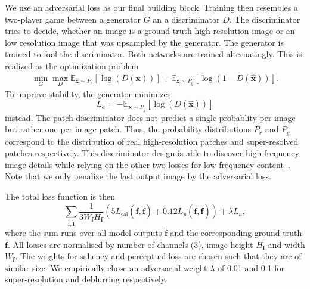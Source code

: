 \documentclass{scrartcl}
\newcommand{\img}{\bm{f}} %
\begin{document}
We use an adversarial loss as our final building block.
Training then resembles a two-player game between a generator \(G\) an a discriminator \(D\).
The discriminator tries to decide, whether an image is a ground-truth high-resolution image or an low resolution image that was upsampled by the generator.
The generator is trained to fool the discriminator.
Both networks are trained alternatingly.
This is realized as the optimization problem~\cite{GAN}
\begin{align}
 \min_G \max_D \mathbb{E}_{\bm{x} \sim P_r} \left[ \log (D({\bm{x}})) \right] +
  \mathbb{E}_{\hat{\bm{x}} \sim P_g} \left[  \log (1 - D(\hat{\bm{x}})) \right].
\end{align}
To improve stability, the generator minimizes
\begin{equation}
  L_a = - \mathbb{E}_{\hat{\bm{x}} \sim P_g} \left[ \log (D(\hat{\bm{x}})) \right]
\end{equation}
instead.
The patch-discriminator does not predict a single probablity per image but rather one per image patch.
Thus, the probability distributions $P_r$ and $P_g$ correspond to the distribution of real high-resolution patches and super-resolved patches respectively.
This discriminator design is able to discover high-frequency image details while relying on the other two losses for low-frequency content~\cite{PatchGAN}.
Note that we only penalize the last output image by the adversarial loss.

The total loss function is then
\begin{equation}
  \label{eq:total-loss}
\sum_{\img, \hat{\img}}
\frac{1}{3 W_{\img} H_{\img}}
  \left( 5 L_{\text{sal}} (\img, \hat{\img}) + 0.12  L_p(\img, \hat{\img}) \right) + \lambda L_a,
\end{equation}
where the sum runs over all model outputs \(\hat{\img}\) and the corresponding ground truth \(\img\).
All losses are normalised by number of channels (3), image height \(H_{\img}\) and width \(W_{\img}\).
The weights for saliency and perceptual loss are chosen such that they are of similar size.
We empirically chose an adversarial weight $\lambda$ of 0.01 and 0.1 for super-resolution and deblurring respectively.
\end{document}
